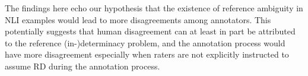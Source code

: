The findings here echo our hypothesis that the existence of reference ambiguity in NLI examples would lead to more disagreements among annotators. This potentially suggests that human disagreement can at least in part be attributed to the reference (in-)determinacy problem, and the annotation process would have more disagreement especially when raters are not explicitly instructed to assume RD during the annotation process.






